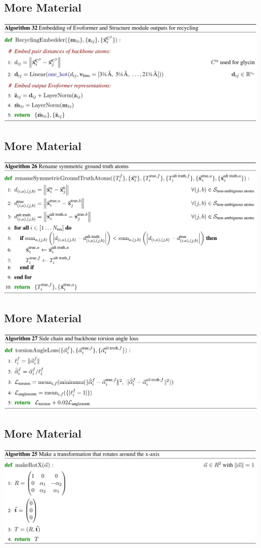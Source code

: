 \documentclass[presentation, smaller]{beamer}
\begin{document}
\subsection*{More Material}
\label{sec:org4c8a385}
\begin{center}
\includegraphics[width=.9\linewidth]{./imgs/recycling-embedding-algo32.png}
\end{center}
\subsection*{More Material}
\label{sec:orgf95881a}
\begin{center}
\includegraphics[width=.9\linewidth]{./imgs/rename-truth-atoms-algo26.png}
\end{center}
\subsection*{More Material}
\label{sec:org42881cd}
\begin{center}
\includegraphics[width=.9\linewidth]{./imgs/sidechain-backbonetorsion-loss-algo27.png}
\end{center}
\subsection*{More Material}
\label{sec:orga641347}
\begin{center}
\includegraphics[width=.9\linewidth]{./imgs/xaxis-transform-algo.png}
\end{center}
\end{document}
